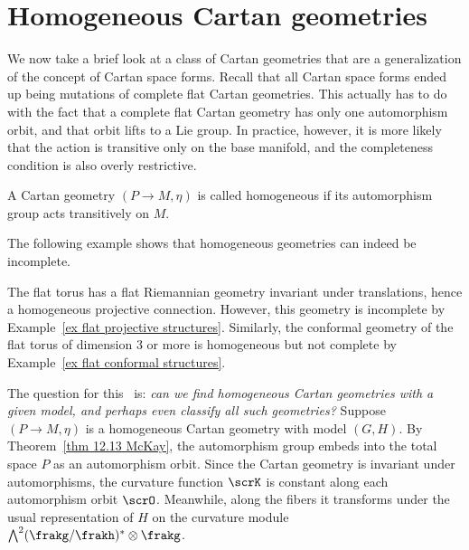

\section{Homogeneous Cartan geometries}

We now take a brief look at a class of Cartan geometries that are a generalization of the concept of Cartan space forms. Recall that all Cartan space forms ended up being mutations of complete flat Cartan geometries. This actually has to do with the fact that a complete flat Cartan geometry has only one automorphism orbit, and that orbit lifts to a Lie group. In practice, however, it is more likely that the action is transitive only on the base manifold, and the completeness condition is also overly restrictive.


\begin{defn}
    A Cartan geometry $(P\to M,\eta)$ is called homogeneous if its automorphism group acts transitively on $M$.
\end{defn}

The following example shows that homogeneous geometries can indeed be incomplete.

\begin{example}
    The flat torus has a flat Riemannian geometry invariant under translations, hence a homogeneous projective connection. However, this geometry is incomplete by Example~\ref{ex flat projective structures}. Similarly, the conformal geometry of the flat torus of dimension $3$ or more is homogeneous but not complete by Example~\ref{ex flat conformal structures}.
\end{example}

The question for this \sect\ is: \emph{can we find homogeneous Cartan geometries with a given model, and perhaps even classify all such geometries?} Suppose $(P\to M,\eta)$ is a homogeneous Cartan geometry with model $(G,H)$. By Theorem~\ref{thm 12.13 McKay}, the automorphism group embeds into the total space $P$ as an automorphism orbit. Since the Cartan geometry is invariant under automorphisms, the curvature function $\scrK$ is constant along each automorphism orbit $\scrO$. Meanwhile, along the fibers it transforms under the usual representation of $H$ on the curvature module $\bigwedge\nolimits^2(\frakg\slash\frakh)^\ast\otimes\frakg$. 

